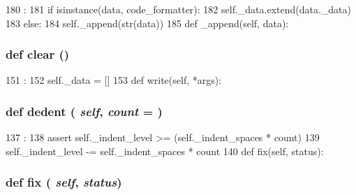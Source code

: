 \begin{DoxyCode}
180                           :
181         if isinstance(data, code_formatter):
182             self._data.extend(data._data)
183         else:
184             self._append(str(data))
185 
    def _append(self, data):
\end{DoxyCode}
\hypertarget{classm5_1_1util_1_1code__formatter_1_1code__formatter_a07b95aa63e9e2d286ef0aa83d5bb34b2}{
\subsubsection[{clear}]{\setlength{\rightskip}{0pt plus 5cm}def clear ()}}
\label{classm5_1_1util_1_1code__formatter_1_1code__formatter_a07b95aa63e9e2d286ef0aa83d5bb34b2}



\begin{DoxyCode}
151                :
152         self._data = []
153 
    def write(self, *args):
\end{DoxyCode}
\hypertarget{classm5_1_1util_1_1code__formatter_1_1code__formatter_a5c9a0f0b372ff8e28fc0580b9ef5b4b3}{
\subsubsection[{dedent}]{\setlength{\rightskip}{0pt plus 5cm}def dedent ( {\em self}, \/   {\em count} = {})}}
\label{classm5_1_1util_1_1code__formatter_1_1code__formatter_a5c9a0f0b372ff8e28fc0580b9ef5b4b3}



\begin{DoxyCode}
137                              :
138         assert self._indent_level >= (self._indent_spaces * count)
139         self._indent_level -= self._indent_spaces * count
140 
    def fix(self, status):
\end{DoxyCode}
\hypertarget{classm5_1_1util_1_1code__formatter_1_1code__formatter_ae0b8c8dd3742689d128460a7bb0926bf}{
\subsubsection[{fix}]{\setlength{\rightskip}{0pt plus 5cm}def fix ( {\em self}, \/   {\em status})}}
\label{classm5_1_1util_1_1code__formatter_1_1code__formatter_ae0b8c8dd3742689d128460a7bb0926bf}



